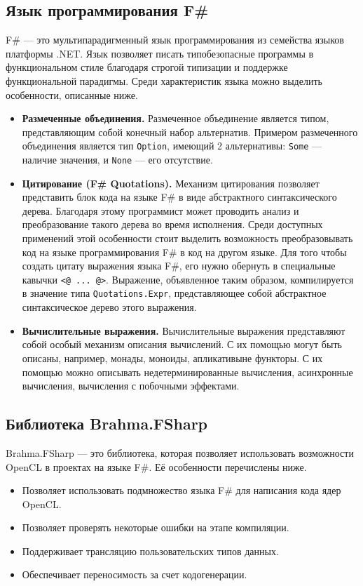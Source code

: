 \subsection{Язык программирования F\#}
F\# --- это мультипарадигменный язык программирования из семейства языков платформы .NET. Язык позволяет писать типобезопасные программы в функциональном стиле благодаря строгой типизации и поддержке функциональной парадигмы. Среди характеристик языка можно выделить особенности, описанные ниже.
\begin{itemize}
    \item \textbf{Размеченные объединения.} Размеченное объединение является типом, представляющим собой конечный набор альтернатив. Примером размеченного объединения является тип \verb|Option|, имеющий 2 альтернативы: \verb|Some| --- наличие значения, и \verb|None| --- его отсутствие. 
    \item \textbf{Цитирование (F\# Quotations).} Механизм цитирования позволяет представить блок кода на языке F\# в виде абстрактного синтаксического дерева. Благодаря этому программист может проводить анализ и преобразование такого дерева во время исполнения. Среди доступных применений этой особенности стоит выделить возможность преобразовывать код на языке программирования F\# в код на другом языке. Для того чтобы создать цитату выражения языка F\#, его нужно обернуть в специальные кавычки \verb|<@ ... @>|. Выражение, объявленное таким образом, компилируется в значение типа \verb|Quotations.Expr|, представляющее собой абстрактное синтаксическое дерево этого выражения.
    \item \textbf{Вычислительные выражения.} Вычислительные выражения представляют собой особый механизм описания вычислений. С их помощью могут быть описаны, например, монады, моноиды, апликативыне функторы. С их помощью можно описывать недетерминированные вычисления, асинхронные вычисления, вычисления с побочными эффектами. 
\end{itemize}

\subsection{Библиотека Brahma.FSharp}
Brahma.FSharp --- это библиотека, которая позволяет использовать возможности OpenCL в проектах на языке F\#.
Её особенности перечислены ниже.
\begin{itemize}
    \item Позволяет использовать подмножество языка F\# для написания кода ядер OpenCL.
    \item Позволяет проверять некоторые ошибки на этапе компиляции.
    \item Поддерживает трансляцию пользовательских типов данных.
    \item Обеспечивает переносимость за счет кодогенерации.
\end{itemize}

